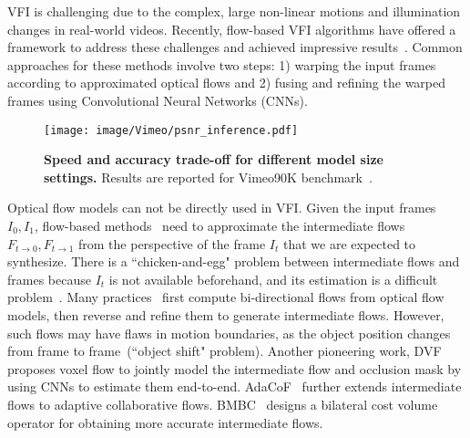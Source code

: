 \documentclass[final]{cvpr}
\begin{document}
VFI is challenging due to the complex, large non-linear motions and illumination changes in real-world videos. Recently, flow-based VFI algorithms have offered a framework to address these challenges and achieved impressive results~\cite{liu2017video, jiang2018super, niklaus2018context, xue2019video, bao2019depth, xu2019quadratic, liu2020enhanced}. Common approaches for these methods involve two steps: 1) warping the input frames according to approximated optical flows and 2) fusing and refining the warped frames using Convolutional Neural Networks (CNNs). 

\begin{figure}
	\centering
	\texttt{[image: image/Vimeo/psnr\_inference.pdf]}
	\caption{\textbf{Speed and accuracy trade-off for different model size settings.} Results are reported for Vimeo90K benchmark~\cite{xue2019video}.} \label{fig:intro_fig}
	\vspace{-1em}
\end{figure}

Optical flow models can not be directly used in VFI. Given the input frames $I_0, I_1$, flow-based methods~\cite{liu2017video,jiang2018super,bao2019depth} need to approximate the intermediate flows $F_{t\rightarrow 0}, F_{t\rightarrow 1}$ from the perspective of the frame $I_t$ that we are expected to synthesize. There is a ``chicken-and-egg" problem between intermediate flows and frames because $I_t$ is not available beforehand, and its estimation is a difficult problem~\cite{jiang2018super, park2020bmbc}. Many practices~\cite{jiang2018super, bao2019depth, xu2019quadratic, liu2020enhanced} first compute bi-directional flows from optical flow models, then reverse and refine them to generate intermediate flows. However, such flows may have flaws in motion boundaries, as the object position changes from frame to frame~(``object shift" problem). Another pioneering work, DVF~\cite{liu2017video} proposes voxel flow to jointly model the intermediate flow and occlusion mask by using CNNs to estimate them end-to-end. AdaCoF~\cite{lee2020adacof} further extends intermediate flows to adaptive collaborative flows. BMBC~\cite{park2020bmbc} designs a bilateral cost volume operator for obtaining more accurate intermediate flows. 
\end{document}
